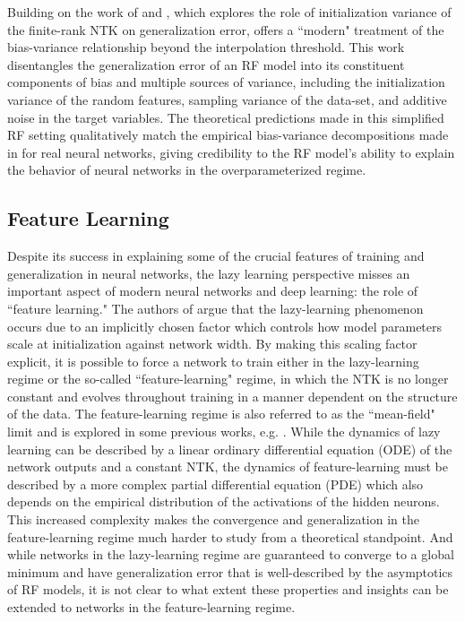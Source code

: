 \documentclass[11pt]{article}
\begin{document}
Building on the work of \cite{meiGeneralizationErrorRandom2019} and \cite{ geigerScalingDescriptionGeneralization2019}, which explores the role of initialization variance of the finite-rank NTK on generalization error, \cite{dascoliDoubleTroubleDouble2020} offers a ``modern" treatment of the bias-variance relationship beyond the interpolation threshold. This work disentangles the generalization error of an RF model into its constituent components of bias and multiple sources of variance, including the initialization variance of the random features, sampling variance of the data-set, and additive noise in the target variables. The theoretical predictions made in this simplified RF setting qualitatively match the empirical bias-variance decompositions made in \cite{nealModernTakeBiasVariance2019} for real neural networks, giving credibility to the RF model's ability to explain the behavior of neural networks in the overparameterized regime.

\subsection{Feature Learning}

Despite its success in explaining some of the crucial features of training and generalization in neural networks, the lazy learning perspective misses an important aspect of modern neural networks and deep learning: the role of ``feature learning."  The authors of \cite{chizatLazyTrainingDifferentiable2020} argue that the lazy-learning phenomenon occurs due to an implicitly chosen factor which controls how model parameters scale at initialization against network width. By making this scaling factor explicit, it is possible to force a network to train either in the lazy-learning regime or the so-called ``feature-learning" regime, in which the NTK is no longer constant and evolves throughout training in a manner dependent on the structure of the data. The feature-learning regime is also referred to as the ``mean-field" limit and is explored in some previous works, e.g. \cite{meiMeanFieldView2018}. While the dynamics of lazy learning can be described by a linear ordinary differential equation (ODE) of the network outputs and a constant NTK, the dynamics of feature-learning must be described by a more complex partial differential equation (PDE) which also depends on the empirical distribution of the activations of the hidden neurons. This increased complexity makes the convergence and generalization in the feature-learning regime much harder to study from a theoretical standpoint. And while networks in the lazy-learning regime are guaranteed to converge to a global minimum and have generalization error that is well-described by the asymptotics of RF models, it is not clear to what extent these properties and insights can be extended to networks in the feature-learning regime. \\
\end{document}
